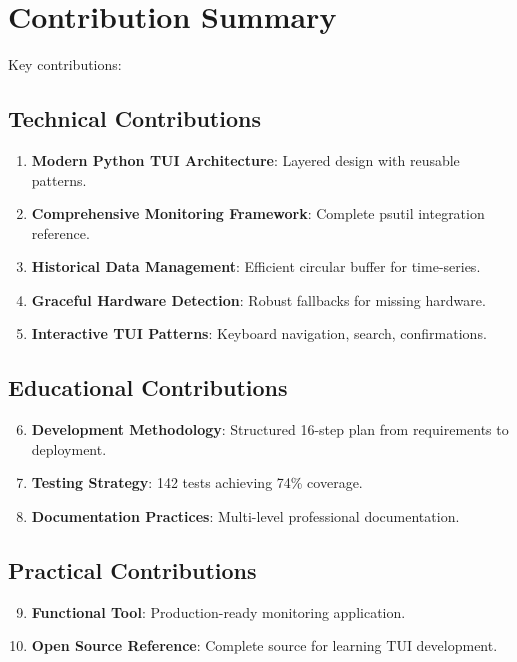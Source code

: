 \documentclass[12pt,a4paper,oneside]{report}
\begin{document}
\section{Contribution Summary}
\label{sec:contributions}

Key contributions:

\subsection{Technical Contributions}
\begin{enumerate}
    \item \textbf{Modern Python TUI Architecture}: Layered design with reusable patterns.
    \item \textbf{Comprehensive Monitoring Framework}: Complete psutil integration reference.
    \item \textbf{Historical Data Management}: Efficient circular buffer for time-series.
    \item \textbf{Graceful Hardware Detection}: Robust fallbacks for missing hardware.
    \item \textbf{Interactive TUI Patterns}: Keyboard navigation, search, confirmations.
\end{enumerate}

\subsection{Educational Contributions}
\begin{enumerate}
    \setcounter{enumi}{5}
    \item \textbf{Development Methodology}: Structured 16-step plan from requirements to deployment.
    \item \textbf{Testing Strategy}: 142 tests achieving 74\% coverage.
    \item \textbf{Documentation Practices}: Multi-level professional documentation.
\end{enumerate}

\subsection{Practical Contributions}
\begin{enumerate}
    \setcounter{enumi}{8}
    \item \textbf{Functional Tool}: Production-ready monitoring application.
    \item \textbf{Open Source Reference}: Complete source for learning TUI development.
\end{enumerate}
\end{document}
